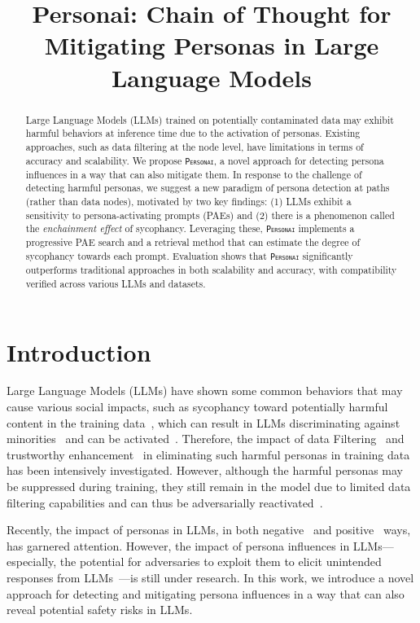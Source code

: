
\title{Personai: Chain of Thought for Mitigating Personas in Large Language Models}

\begin{abstract}
Large Language Models (LLMs) trained on potentially contaminated data may exhibit harmful behaviors at inference time due to the activation of personas. Existing approaches, such as data filtering at the node level, have limitations in terms of accuracy and scalability. We propose \texttt{\textsc{Personai}}, a novel approach for detecting persona influences in a way that can also mitigate them. In response to the challenge of detecting harmful personas, we suggest a new paradigm of persona detection at paths (rather than data nodes), motivated by two key findings: (1) LLMs exhibit a sensitivity to persona-activating prompts (PAEs) and (2) there is a phenomenon called the \textit{enchainment effect} of sycophancy. Leveraging these, \texttt{\textsc{Personai}} implements a progressive PAE search and a retrieval method that can estimate the degree of sycophancy towards each prompt. Evaluation shows that \texttt{\textsc{Personai}} significantly outperforms traditional approaches in both scalability and accuracy, with compatibility verified across various LLMs and datasets. 
\end{abstract}

\section{Introduction}



\label{sec:Introduction}

Large Language Models (LLMs) have shown some common behaviors that may cause various social impacts, such as sycophancy toward potentially harmful content in the training data~\cite{malmqvist2024}, which can result in LLMs discriminating against minorities~\cite{buyl2024} and can be activated~\cite{pellert2024}. Therefore, the impact of data Filtering~\cite{bai2024} and trustworthy enhancement~\cite{chen2025} in eliminating such harmful personas in training data has been intensively investigated. However, although the harmful personas may be suppressed during training, they still remain in the model due to limited data filtering capabilities and can thus be adversarially reactivated~\cite{jiang2024}.

Recently, the impact of personas in LLMs, in both negative~\cite{yu2024} and positive~\cite{ye2024} ways, has garnered attention. However, the impact of persona influences in LLMs---especially, the potential for adversaries to exploit them to elicit unintended responses from LLMs~\cite{xu2025}---is still under research. In this work, we introduce a novel approach for detecting and mitigating persona influences in a way that can also reveal potential safety risks in LLMs.

